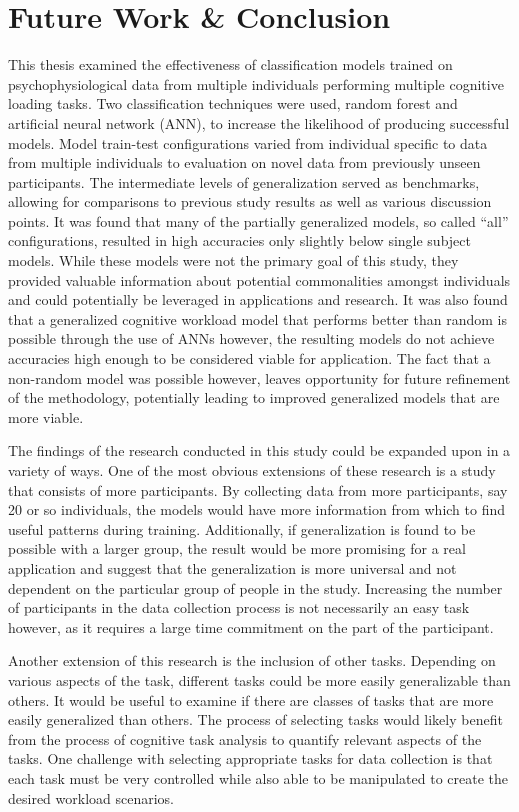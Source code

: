 \documentclass[11pt]{article}
\begin{document}
\section{Future Work \& Conclusion}
	This thesis examined the effectiveness of classification models trained on psychophysiological data from multiple individuals performing multiple cognitive loading tasks. Two classification techniques were used, random forest and artificial neural network (ANN), to increase the likelihood of producing successful models.  Model train-test configurations varied from individual specific to data from multiple individuals to evaluation on novel data from previously unseen participants. The intermediate levels of generalization served as benchmarks, allowing for comparisons to previous study results as well as various discussion points. It was found that many of the partially generalized models, so called ``all'' configurations, resulted in high accuracies only slightly below single subject models. While these models were not the primary goal of this study, they provided valuable information about potential commonalities amongst individuals and could potentially be leveraged in applications and research. It was also found that a generalized cognitive workload model that performs better than random is possible through the use of ANNs however, the resulting models do not achieve accuracies high enough to be considered viable for application. The fact that a non-random model was possible however, leaves opportunity for future refinement of the methodology, potentially leading to improved generalized models that are more viable.
	
	The findings of the research conducted in this study could be expanded upon in a variety of ways. One of the most obvious extensions of these research is a study that consists of more participants. By collecting data from more participants, say 20 or so individuals, the models would have more information from which to find useful patterns during training. Additionally, if generalization is found to be possible with a larger group, the result would be more promising for a real application and suggest that the generalization is more universal and not dependent on the particular group of people in the study. Increasing the number of participants in the data collection process is not necessarily an easy task however, as it requires a large time commitment on the part of the participant.
	
	Another extension of this research is the inclusion of other tasks. Depending on various aspects of the task, different tasks could be more easily generalizable than others. It would be useful to examine if there are classes of tasks that are more easily generalized than others. The process of selecting tasks would likely benefit from the process of cognitive task analysis to quantify relevant aspects of the tasks. One challenge with selecting appropriate tasks for data collection is that each task must be very controlled while also able to be manipulated to create the desired workload scenarios. 
	
\end{document}
